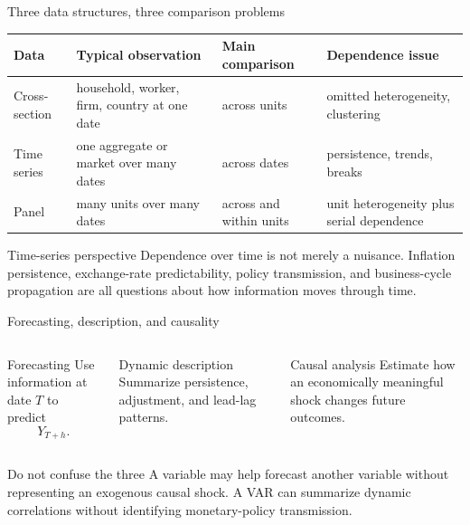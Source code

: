 \documentclass[10pt]{beamer}
\begin{document}
\begin{frame}{Three data structures, three comparison problems}
\small
\begin{tabularx}{\textwidth}{p{}YYY}
\toprule
Data & Typical observation & Main comparison & Dependence issue \\
\midrule
Cross-section & household, worker, firm, country at one date & across units & omitted heterogeneity, clustering \\
Time series & one aggregate or market over many dates & across dates & persistence, trends, breaks \\
Panel & many units over many dates & across and within units & unit heterogeneity plus serial dependence \\
\bottomrule
\end{tabularx}

\pause
\begin{alertblock}{Time-series perspective}
Dependence over time is not merely a nuisance. Inflation persistence, exchange-rate predictability, policy transmission, and business-cycle propagation are all questions about how information moves through time.
\end{alertblock}
\end{frame}

\begin{frame}{Forecasting, description, and causality}
\small
\begin{columns}[T]
\begin{column}{0.32\textwidth}
\begin{block}{Forecasting}
Use information at date $T$ to predict
\[
Y_{T+h}.
\]
\end{block}
\end{column}
\begin{column}{0.32\textwidth}
\begin{block}{Dynamic description}
Summarize persistence, adjustment, and lead-lag patterns.
\end{block}
\end{column}
\begin{column}{0.32\textwidth}
\begin{block}{Causal analysis}
Estimate how an economically meaningful shock changes future outcomes.
\end{block}
\end{column}
\end{columns}

\pause
\begin{alertblock}{Do not confuse the three}
A variable may help forecast another variable without representing an exogenous causal shock. A VAR can summarize dynamic correlations without identifying monetary-policy transmission.
\end{alertblock}
\end{frame}
\end{document}
